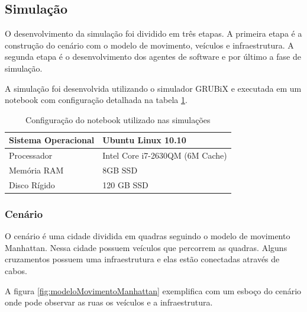 \subsection{Simulação}
\label{subsec:simulacao}

O desenvolvimento da simulação foi dividido em três etapas. A primeira etapa é a construção do cenário com o modelo de movimento, veículos e infraestrutura. A segunda etapa é o desenvolvimento dos agentes de software e por último a fase de simulação. 

A simulação foi desenvolvida utilizando o simulador GRUBiX e executada em um notebook com configuração detalhada na tabela \ref{tab:configuracaoNotebook}.

\begin{table}[ht]
	\centering
	\begin{tabular}{|l|l|}
		\hline
		Sistema Operacional & Ubuntu Linux 10.10 \\ \hline
		Processador & Intel Core i7-2630QM (6M Cache) \\ \hline
		Memória RAM & 8GB SSD \\ \hline
		Disco Rígido & 120 GB SSD \\ \hline 
	\end{tabular}
	\caption{Configuração do notebook utilizado nas simulações}
	\label{tab:configuracaoNotebook}
\end{table}

\subsubsection{Cenário}

O cenário é uma cidade dividida em quadras seguindo o modelo de movimento Manhattan. Nessa cidade possuem veículos que percorrem as quadras. Alguns cruzamentos possuem uma infraestrutura e elas estão conectadas através de cabos. 

A figura \ref{fig:modeloMovimentoManhattan} exemplifica com um esboço do cenário onde pode observar as ruas os veículos e a infraestrutura.

